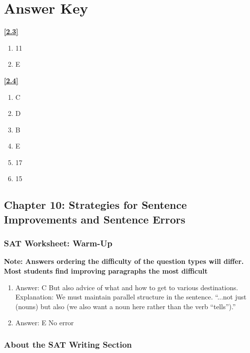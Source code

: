 \chapter{Answer Key}

\textbf{\ref{2.3}}

\begin{enumerate}[label=ex\arabic*)]
\item 11
\item E
\end{enumerate}

\textbf{\ref{2.4}}

\begin{enumerate}[label=\arabic*)]
\item C
\item D
\item B
\item E
\item 17
\item 15
\end{enumerate}


\section{Chapter 10: Strategies for Sentence Improvements and Sentence Errors}

\subsection{SAT Worksheet: Warm-Up}

\textbf{Note: Answers ordering the difficulty of the question types will differ. Most students find improving paragraphs the most difficult}

\bigskip
\begin{enumerate}

\item Answer: C But also advice of what and how to get to various destinations. Explanation: We must maintain parallel structure in the sentence. ``...not just (nouns) but also (we also want a noun here rather than the verb ``tells'').''

\item Answer: E No error

\end{enumerate}

\subsection{About the SAT Writing Section}

